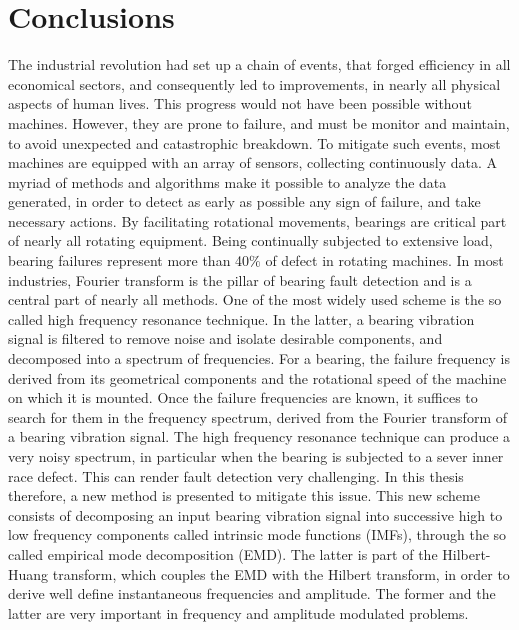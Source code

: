 \documentclass[../Main/thesis.tex]{subfiles}
\begin{document}
	\section{Conclusions}
	\label{sec:summary_and_conclusions}
	The industrial revolution had set up a chain of events, that forged efficiency in all economical sectors, and consequently led to improvements, in nearly all physical aspects of human lives. This progress would not have been possible without machines. However, they are prone to failure, and must be monitor and maintain, to avoid unexpected and catastrophic breakdown. To mitigate such events, most machines are equipped with an array of sensors, collecting continuously data. A myriad of methods and algorithms make it possible to analyze the data generated, in order to detect as early as possible any sign of failure, and take necessary actions.
	\justify
	By facilitating rotational movements, bearings are critical part of nearly all rotating equipment. Being continually subjected to extensive load, bearing failures represent more than 40$\%$ of defect in rotating machines. In most industries, Fourier transform is the pillar of bearing fault detection and is a central part of nearly all methods.
	One of the most widely used scheme is the so called high frequency resonance technique. 
	In the latter, a bearing vibration signal is filtered to remove noise and isolate desirable components, and decomposed into a spectrum of frequencies. For a bearing, the failure frequency is derived from its geometrical components and the rotational speed of the machine on which it is mounted. Once the failure frequencies are known, it suffices to search for them in the frequency spectrum, derived from the Fourier transform of a bearing vibration signal. 
	\justify
	The high frequency resonance technique can produce a very noisy spectrum, in particular when the bearing is subjected to a sever inner race defect. This can render fault detection very challenging. In this thesis therefore, a new method is presented to mitigate this issue.
	This new scheme consists of decomposing an input bearing vibration signal into successive high to low frequency components called intrinsic mode functions (IMFs), through the so called empirical mode decomposition (EMD). The latter is part of the Hilbert-Huang transform, which couples the EMD with the Hilbert transform, in order to derive well define instantaneous frequencies and amplitude. The former and the latter are very important in frequency and amplitude modulated problems.
\end{document}
